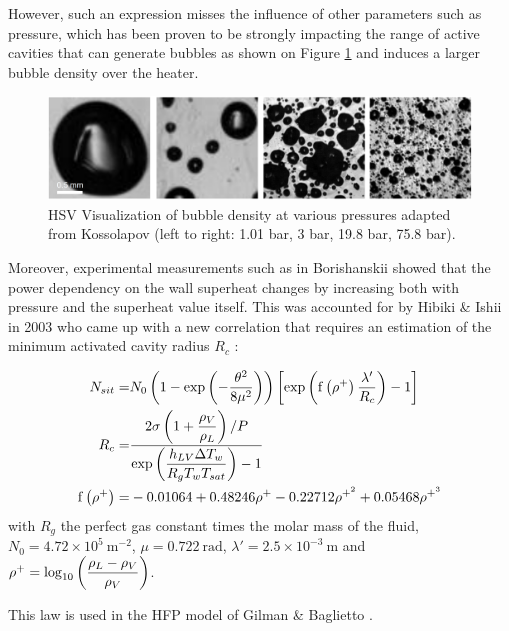 However, such an expression misses the influence of other parameters such as pressure, which has been proven to be strongly impacting the range of active cavities that can generate bubbles as shown on Figure \ref{fig:nsd_P_koss} and induces a larger bubble density over the heater. 

\begin{figure}[h!]
\centering
\includegraphics[width=0.7\linewidth]{img/NSD/nsd_press_koss.png}
\caption{HSV Visualization of bubble density at various pressures adapted from Kossolapov \cite{kossolapov_experimental_2021} (left to right: 1.01 bar, 3 bar, 19.8 bar, 75.8 bar). }
\label{fig:nsd_P_koss}
\end{figure}

\npar

Moreover, experimental measurements such as in Borishanskii \cite{borishanskii_heat_1969} showed that the power dependency on the wall superheat changes by increasing both with pressure and the superheat value itself. This was accounted for by Hibiki \& Ishii in 2003 \cite{hibiki_active_2003} who came up with a new correlation that requires an estimation of the minimum activated cavity radius $R_{c}$ : 


\begin{align}
N_{sit} =& N_{0}\parth{1-\exp{-\dfrac{\theta^{2}}{8\mu^{2}} } }\crocht{\exp{ \mathrm{f}\parth{\rho^{+}}\dfrac{\lambda '}{R_{c}} } -1}
\label{eq:nsit_hibiki} \\
%
R_{c} =& \dfrac{2\sigma\parth{1+\dfrac{\rho_{V}}{\rho_{L}}} / P }{\exp{\dfrac{h_{LV} \Delta T_{w}}{R_{g}T_{w}T_{sat}} } -1}\\
%
\mathrm{f}\parth{\rho^{+}} =& -0.01064 + 0.48246\rho^{+} - 0.22712 \rho^{+^{2}} + 0.05468 \rho^{+^{3}}
\end{align}
with $R_{g}$ the perfect gas constant times the molar mass of the fluid,  $N_{0}=4.72\times 10^{5}\ \mathrm{m}^{-2}$, $\mu = 0.722\ \mathrm{rad}$, $\lambda ' = 2.5 \times 10^{-3} \ \mathrm{m}$ and $\rho^{+}=\mathrm{log}_{10}\left( \dfrac{\rho_{L}-\rho_{V}}{\rho_{V}} \right)$.


\begin{remark*}{}
This law is used in the HFP model of Gilman \& Baglietto \cite{gilman_self-consistent_2017}.
\end{remark*}

